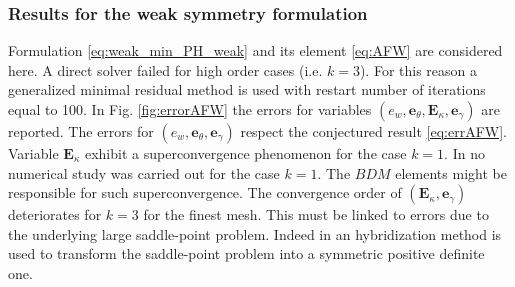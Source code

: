 \documentclass{ifacconf}
\begin{document}
\subsubsection{Results for the weak symmetry formulation} 
Formulation \eqref{eq:weak_min_PH_weak} and its element \eqref{eq:AFW} are considered here. A direct solver failed for high order cases (i.e. $k=3$). For this reason a generalized minimal residual method is used with restart number of iterations equal to 100. In Fig. \ref{fig:errorAFW} the errors for variables $(e_w, \bm{e}_\theta, \bm{E}_\kappa, \bm{e}_\gamma)$  are reported. The errors for $(e_w, \bm{e}_\theta, \bm{e}_\gamma)$ respect the conjectured result \eqref{eq:errAFW}. Variable $\bm{E}_\kappa$ exhibit a superconvergence phenomenon for the case $k=1$. In \cite{ArnoldWeak} no numerical study was carried out for the case $k=1$. The $BDM$ elements might be responsible for such superconvergence. The convergence order of $(\bm{E}_\kappa, \bm{e}_\gamma)$ deteriorates for $k=3$ for the finest mesh. This must be linked to errors due to the underlying large saddle-point problem. Indeed in \cite{ArnoldWeak} an hybridization method is used to transform the saddle-point problem into a symmetric positive definite one.
\end{document}
